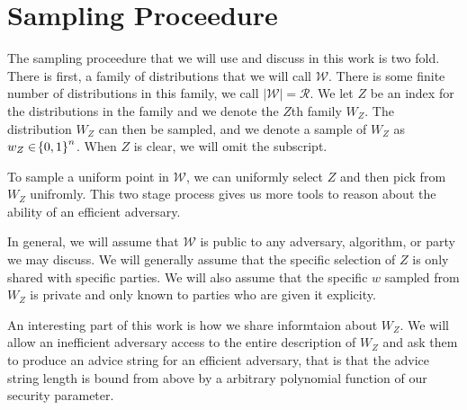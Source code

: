 
\section{Sampling Proceedure}
The sampling proceedure that we will use and discuss in this work is two fold.
There is first, a family of distributions that we will call $\mathcal{W}$. 
There is some finite number of distributions in this family, we call $|\mathcal{W}| = \mathcal{R}$. 
We let $Z$ be an index for the distributions in the family and we denote the $Z$th family $W_Z$. 
The distribution $W_Z$ can then be sampled, and we denote a sample of $W_Z$ as $w_{Z} \in \!\left\{ 0,1 \right\}^{n}$. When $Z$ is clear, we will omit the subscript.

To sample a uniform point in $\mathcal{W}$, we can uniformly select $Z$ and then pick from $W_Z$ unifromly. 
This two stage process gives us more tools to reason about the ability of an efficient adversary. 

In general, we will assume that $\mathcal{W}$ is public to any adversary, algorithm, or party we may discuss. 
We will generally assume that the specific selection of $Z$ is only shared with specific parties.
We will also assume that the specific $w$ sampled from $W_Z$ is private and only known to parties who are given it explicity. 

An interesting part of this work is how we share informtaion about $W_Z$. We will allow an inefficient adversary access to the entire description of $W_Z$ and ask them to produce an advice string for an efficient adversary, that is that the advice string length is bound from above by a arbitrary polynomial function of our security parameter. 